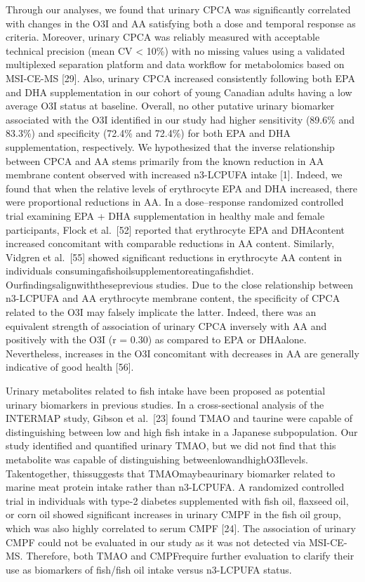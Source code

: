 \documentclass[journal=jacsat,manuscript=article]{achemso}
\begin{document}
Through our analyses, we found that urinary CPCA was significantly
correlated with changes in the O3I and AA satisfying both a dose and
temporal response as criteria. Moreover, urinary CPCA was reliably
measured with acceptable technical precision (mean CV \textless{} 10\%)
with no missing values using a validated multiplexed separation platform
and data workflow for metabolomics based on MSI-CE-MS {[}29{]}. Also,
urinary CPCA increased consistently following both EPA and DHA
supplementation in our cohort of young Canadian adults having a low
average O3I status at baseline. Overall, no other putative urinary
biomarker associated with the O3I identified in our study had higher
sensitivity (89.6\% and 83.3\%) and specificity (72.4\% and 72.4\%) for
both EPA and DHA supplementation, respectively. We hypothesized that the
inverse relationship between CPCA and AA stems primarily from the known
reduction in AA membrane content observed with increased n3-LCPUFA
intake {[}1{]}. Indeed, we found that when the relative levels of
erythrocyte EPA and DHA increased, there were proportional reductions in
AA. In a dose--response randomized controlled trial examining EPA + DHA
supplementation in healthy male and female participants, Flock et
al.~{[}52{]} reported that erythrocyte EPA and DHAcontent increased
concomitant with comparable reductions in AA content. Similarly, Vidgren
et al.~{[}55{]} showed significant reductions in erythrocyte AA content
in individuals consumingafishoilsupplementoreatingafishdiet.
Ourfindingsalignwiththeseprevious studies. Due to the close relationship
between n3-LCPUFA and AA erythrocyte membrane content, the specificity
of CPCA related to the O3I may falsely implicate the latter. Indeed,
there was an equivalent strength of association of urinary CPCA
inversely with AA and positively with the O3I (r = 0.30) as compared to
EPA or DHAalone. Nevertheless, increases in the O3I concomitant with
decreases in AA are generally indicative of good health {[}56{]}.

Urinary metabolites related to fish intake have been proposed as
potential urinary biomarkers in previous studies. In a cross-sectional
analysis of the INTERMAP study, Gibson et al.~{[}23{]} found TMAO and
taurine were capable of distinguishing between low and high fish intake
in a Japanese subpopulation. Our study identified and quantified urinary
TMAO, but we did not find that this metabolite was capable of
distinguishing betweenlowandhighO3Ilevels. Takentogether, thissuggests
that TMAOmaybeaurinary biomarker related to marine meat protein intake
rather than n3-LCPUFA. A randomized controlled trial in individuals with
type-2 diabetes supplemented with fish oil, flaxseed oil, or corn oil
showed significant increases in urinary CMPF in the fish oil group,
which was also highly correlated to serum CMPF {[}24{]}. The association
of urinary CMPF could not be evaluated in our study as it was not
detected via MSI-CE-MS. Therefore, both TMAO and CMPFrequire further
evaluation to clarify their use as biomarkers of fish/fish oil intake
versus n3-LCPUFA status.
\end{document}
